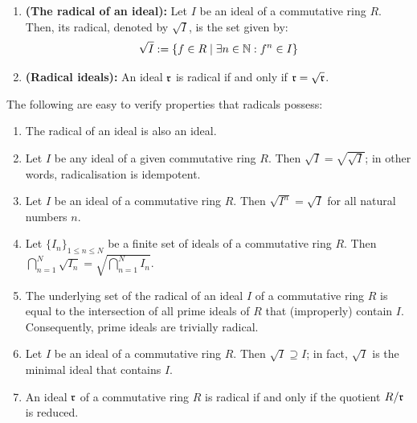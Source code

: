                 \begin{definition} \label{def: radicals}
                    \noindent
                    \begin{enumerate}
                        \item \textbf{(The radical of an ideal):} Let $I$ be an ideal of a commutative ring $R$. Then, its radical, denoted by $\sqrt{I}$, is the set given by:
                            $$\sqrt{I} := \{f \in R \mid \exists n \in \mathbb{N}: f^n \in I\}$$
                        \item \textbf{(Radical ideals):} An ideal $\mathfrak{r}$ is radical if and only if $\mathfrak{r} = \sqrt{\mathfrak{r}}$. 
                    \end{enumerate}
                \end{definition}
                \begin{proposition} \label{prop: radical_properties}
                    The following are easy to verify properties that radicals possess:
                        \begin{enumerate}
                            \item The radical of an ideal is also an ideal.
                            \item Let $I$ be any ideal of a given commutative ring $R$. Then $\sqrt{I} = \sqrt{\sqrt{I}}$; in other words, radicalisation is idempotent.
                            \item Let $I$ be an ideal of a commutative ring $R$. Then $\sqrt{I^n} = \sqrt{I}$ for all natural numbers $n$. 
                            \item Let $\{I_n\}_{1 \leq n \leq N}$ be a finite set of ideals of a commutative ring $R$. Then $\bigcap_{n = 1}^N \sqrt{I_n} = \sqrt{\bigcap_{n = 1}^N I_n}$. 
                            \item The underlying set of the radical of an ideal $I$ of a commutative ring $R$ is equal to the intersection of all prime ideals of $R$ that (improperly) contain $I$. Consequently, prime ideals are trivially radical.
                            \item  Let $I$ be an ideal of a commutative ring $R$. Then $\sqrt{I} \supseteq I$; in fact, $\sqrt{I}$ is the minimal ideal that contains $I$. 
                            \item An ideal $\mathfrak{r}$ of a commutative ring $R$ is radical if and only if the quotient $R/\mathfrak{r}$ is reduced.
                \end{enumerate}
                \end{proposition}
